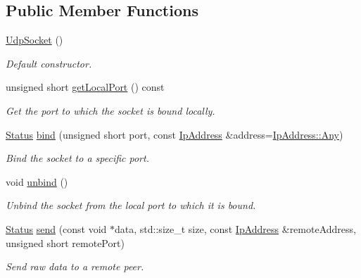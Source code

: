 \subsection*{Public Member Functions}
\begin{DoxyCompactItemize}
\item 
\mbox{\hyperlink{classsf_1_1_udp_socket_abb10725e26dee9d3a8165fe87ffb71bb}{Udp\+Socket}} ()
\begin{DoxyCompactList}\small\item\em Default constructor. \end{DoxyCompactList}\item 
unsigned short \mbox{\hyperlink{classsf_1_1_udp_socket_a5c03644b3da34bb763bce93e758c938e}{get\+Local\+Port}} () const
\begin{DoxyCompactList}\small\item\em Get the port to which the socket is bound locally. \end{DoxyCompactList}\item 
\mbox{\hyperlink{classsf_1_1_socket_a51bf0fd51057b98a10fbb866246176dc}{Status}} \mbox{\hyperlink{classsf_1_1_udp_socket_ad764c3d06d90b4714dcc97a0d1647bcc}{bind}} (unsigned short port, const \mbox{\hyperlink{classsf_1_1_ip_address}{Ip\+Address}} \&address=\mbox{\hyperlink{classsf_1_1_ip_address_a3dbc10b0dc6804cc69e29342f7406907}{Ip\+Address\+::\+Any}})
\begin{DoxyCompactList}\small\item\em Bind the socket to a specific port. \end{DoxyCompactList}\item 
void \mbox{\hyperlink{classsf_1_1_udp_socket_a2c4abb8102a1bd31f51fcfe7f15427a3}{unbind}} ()
\begin{DoxyCompactList}\small\item\em Unbind the socket from the local port to which it is bound. \end{DoxyCompactList}\item 
\mbox{\hyperlink{classsf_1_1_socket_a51bf0fd51057b98a10fbb866246176dc}{Status}} \mbox{\hyperlink{classsf_1_1_udp_socket_a664ab8f26f37c21cc4de1b847c2efcca}{send}} (const void $\ast$data, std\+::size\+\_\+t size, const \mbox{\hyperlink{classsf_1_1_ip_address}{Ip\+Address}} \&remote\+Address, unsigned short remote\+Port)
\begin{DoxyCompactList}\small\item\em Send raw data to a remote peer. \end{DoxyCompactList}\item 

\end{DoxyCompactItemize}
